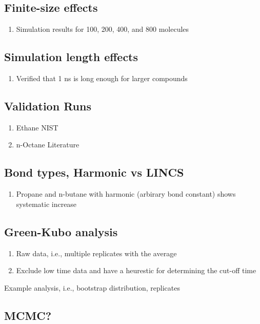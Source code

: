\documentclass[preprint,review,12pt]{elsarticle}
\begin{document}
	\subsection{Finite-size effects}
	
	\begin{enumerate}
		\item Simulation results for 100, 200, 400, and 800 molecules
	\end{enumerate}
	
	\subsection{Simulation length effects}
	
	\begin{enumerate}
		\item Verified that 1 ns is long enough for larger compounds
	\end{enumerate}
	
	\subsection{Validation Runs}
	
	\begin{enumerate}
		\item Ethane NIST
		\item n-Octane Literature
	\end{enumerate}
	
	\subsection{Bond types, Harmonic vs LINCS}
	
	\begin{enumerate}
		\item Propane and n-butane with harmonic (arbirary bond constant) shows systematic increase
	\end{enumerate}
	
	\subsection{Green-Kubo analysis}
	
	\begin{enumerate}
		\item Raw data, i.e., multiple replicates with the average
		\item Exclude low time data and have a heurestic for determining the cut-off time
	\end{enumerate}
	
	Example analysis, i.e., bootstrap distribution, replicates
	
	\subsection{MCMC?}
	
	
	
	
\end{document}
